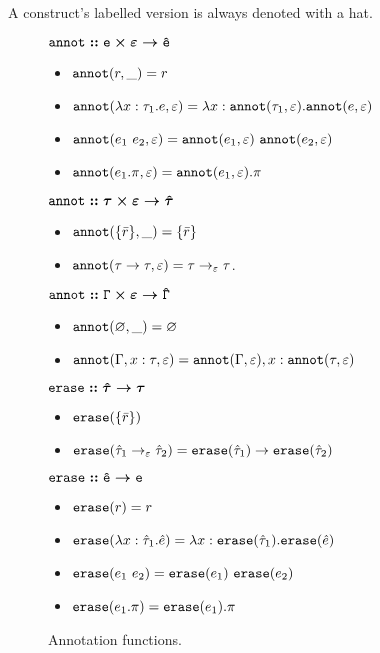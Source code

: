 A construct's labelled version is always denoted with a hat. \\

\begin{figure}[h]
\vspace{-5pt}

	
$\bm{\mathtt{annot :: e \times \varepsilon \rightarrow \hat e}}$

\begin{itemize}
	\setlength\itemsep{-0.7em}
	\item[] $\mathtt{annot}(r, \_) = r$
	\item[] $\mathtt{annot}(\lambda x: \tau_1 . e, \varepsilon) = \lambda x: \mathtt{annot}(\tau_1, \varepsilon) . \mathtt{annot}(e, \varepsilon)$
	\item[] $\mathtt{annot}(e_1~e_2, \varepsilon) = \mathtt{annot}(e_1, \varepsilon)~\mathtt{annot}(e_2, \varepsilon)$
	\item[] $\mathtt{annot}(e_1.\pi, \varepsilon) = \mathtt{annot}(e_1, \varepsilon).\pi$
\end{itemize}
	
$\bm{\mathtt{annot :: \tau \times \varepsilon \rightarrow \hat \tau}}$

\begin{itemize}
	\setlength\itemsep{-0.7em}
	\item[] $\mathtt{annot}(\{ \bar r \}, \_) = \{ \bar r \}$
	\item[] $\mathtt{annot}(\tau \rightarrow \tau, \varepsilon) = \tau \rightarrow_{\varepsilon} \tau$.	
\end{itemize}

$\bm{\mathtt{annot :: \Gamma \times \varepsilon \rightarrow \hat \Gamma}}$

\begin{itemize}
	\setlength\itemsep{-0.7em}
	\item[] $\mathtt{annot}(\varnothing, \_) = \varnothing$
	\item[] $\mathtt{annot}(\Gamma, x: \tau, \varepsilon) = \mathtt{annot}(\Gamma, \varepsilon), x: \mathtt{annot}(\tau, \varepsilon)$
\end{itemize}

$\bm{\mathtt{erase :: \hat \tau \rightarrow \tau}}$
\begin{itemize}
	\setlength\itemsep{-0.7em}
	\item[] $\mathtt{erase}(\{ \bar r \})$
	\item[] $\mathtt{erase}(\hat \tau_1 \rightarrow_{\varepsilon} \hat \tau_2) = \mathtt{erase}(\hat \tau_1) \rightarrow \mathtt{erase}(\hat \tau_2)$
\end{itemize}

$\bm{\mathtt{erase :: \hat e \rightarrow e}}$
\begin{itemize}
	\setlength\itemsep{-0.7em}
	\item[] $\mathtt{erase}(r) = r$
	\item[] $\mathtt{erase}(\lambda x: \hat \tau_1 . \hat e) = \lambda x: \mathtt{erase}(\hat \tau_1) . \mathtt{erase}(\hat e)$
	\item[] $\mathtt{erase}(e_1~e_2) = \mathtt{erase}(e_1)~\mathtt{erase}(e_2)$
	\item[] $\mathtt{erase}(e_1.\pi) = \mathtt{erase}(e_1).\pi$
\end{itemize}

\vspace{-7pt}
\caption{Annotation functions.}
\label{This is the label.}
\end{figure}


